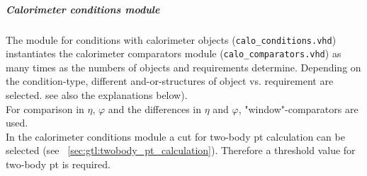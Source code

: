 \subparagraph{Calorimeter conditions module}\label{sec:gtl:calo_conditions_module}

The module for conditions with calorimeter objects (\texttt{calo\_conditions.vhd}) instantiates the calorimeter comparators module (\texttt{calo\_comparators.vhd}) as many times as
the numbers of objects and requirements determine. Depending on the condition-type, different and-or-structures of object vs. requirement are selected.
see also the explanations below).\\
For comparison in $\eta$, $\varphi$ and the differences in $\eta$ and $\varphi$, "window"-comparators are used.\\
In the calorimeter conditions module a cut for two-body pt calculation can be selected (see ~\ref{sec:gtl:twobody_pt_calculation}). Therefore a threshold value for two-body pt is required.\\

% 

